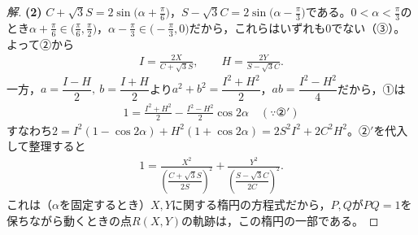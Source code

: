 \documentclass[../main.tex]{subfiles}
\begin{document}
\begin{proof}[解]
  \textbf{(2)} $C+\sqrt3S=2\sin\bigl(\alpha+\frac\pi6\bigr)$，$S-\sqrt3C=2\sin\bigl(\alpha-\frac\pi3\bigr)$である。$0<\alpha<\frac\pi3$のとき$\alpha+\frac\pi6\in\bigl(\frac\pi6,\frac\pi2\bigr)$，$\alpha-\frac\pi3\in\bigl(-\frac\pi3,0\bigr)$だから，これらはいずれも$0$でない（③）。よって②から
  \begin{align*}
    I=\frac{2X}{C+\sqrt3S},\qquad H=\frac{2Y}{S-\sqrt3C}.\tag{②$'$}
  \end{align*}
  一方，$a=\dfrac{I-H}2,\ b=\dfrac{I+H}2$より$a^2+b^2=\dfrac{I^2+H^2}2$，$ab=\dfrac{I^2-H^2}4$だから，①は
  \begin{align*}
    1=\frac{I^2+H^2}2-\frac{I^2-H^2}2\cos2\alpha\quad(\because②')
  \end{align*}
  すなわち$2=I^2(1-\cos2\alpha)+H^2(1+\cos2\alpha)=2S^2I^2+2C^2H^2$。②$'$を代入して整理すると
  \begin{align*}
    1=\frac{X^2}{\left(\dfrac{C+\sqrt3S}{2S}\right)^2}+\frac{Y^2}{\left(\dfrac{S-\sqrt3C}{2C}\right)^2}.
  \end{align*}
  これは（$\alpha$を固定するとき）$X,Y$に関する楕円の方程式だから，$P,Q$が$PQ=1$を保ちながら動くときの点$R(X,Y)$の軌跡は，この楕円の一部である。
\end{proof}
\end{document}

